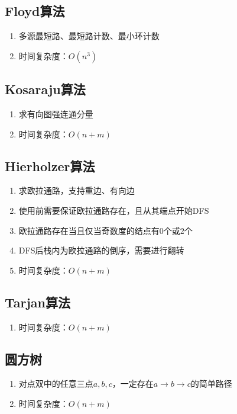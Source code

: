 \documentclass[twocolumn,a4,8pt]{article}  %
\begin{document}
		\subsection{Floyd算法}
			\noindent\begin{enumerate}
				\item 多源最短路、最短路计数、最小环计数
				\item 时间复杂度：$O(n^3)$
			\end{enumerate}
	 	 	
	 	 	
		\subsection{Kosaraju算法}
			\noindent\begin{enumerate}
				\item 求有向图强连通分量
				\item 时间复杂度：$O(n+m)$
			\end{enumerate}
	 	 	
	 	 	
		\subsection{Hierholzer算法}
			\noindent\begin{enumerate}
				\item 求欧拉通路，支持重边、有向边
				\item 使用前需要保证欧拉通路存在，且从其端点开始DFS
				\item 欧拉通路存在当且仅当奇数度的结点有$0$个或$2$个
				\item DFS后栈内为欧拉通路的倒序，需要进行翻转
				\item 时间复杂度：$O(n+m)$
			\end{enumerate}
	 	 	
	 	 	
	 	\subsection{Tarjan算法}
			\noindent\begin{enumerate}
				\item 时间复杂度：$O(n+m)$
			\end{enumerate}
	 	 	
	 	 	
	 	\subsection{圆方树}
			\noindent\begin{enumerate}
				\item 对点双中的任意三点$a,b,c$，一定存在$a\rightarrow b\rightarrow c$的简单路径
				\item 时间复杂度：$O(n+m)$
			\end{enumerate}
	 	 	
	 	 	
\end{document}
